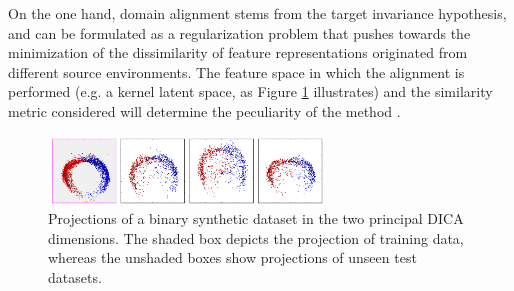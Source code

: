 On the one hand, domain alignment stems from the target invariance hypothesis, 
and can be formulated as a regularization problem that pushes towards the 
minimization of the dissimilarity of feature  representations originated 
from different source environments. The feature space in which the 
alignment is performed (e.g. a kernel latent space, as Figure \ref{fig:dica} illustrates)
and the similarity metric considered will
determine the peculiarity of the method
\cite{shenWassersteinDistanceGuided2018,liangComprehensiveSurveyTestTime2023}. \\

\begin{figure}[H]
    \centering
    \includegraphics[width=0.65\textwidth]{img/introduction/dica.png}
    \caption{
    Projections of a binary synthetic dataset in the two principal DICA
    dimensions. The shaded box depicts the projection of training 
    data, whereas the unshaded boxes show projections of unseen 
    test datasets. \cite{muandetDomainGeneralizationInvariant2013}
    }
    \label{fig:dica}
\end{figure}

